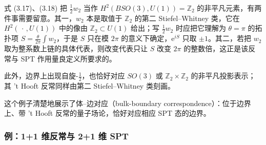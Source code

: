 \begin{yizhu}
式 (3.17)、(3.18) 把 $\frac{1}{2}w_2$ 当作 $H^2(BSO(3),U(1))=\mathbb{Z}_2$ 的非平凡元素，有两件事需要留意。其一，$w_2$ 本是取值于 $\mathbb{Z}_2$ 的第二 Stiefel--Whitney 类，它在 $H^2(\,\cdot\,,U(1))$ 中的像由 $\mathbb{Z}_2\subset U(1)$ 给出；写 $\frac{1}{2}w_2$ 时应把它理解为 $\theta=\pi$ 的拓扑项 $S=\frac{\theta}{2\pi}\int w_2$，于是 $S$ 只在模 $2\pi$ 的意义下确定，$\mathrm{e}^{iS}$ 只取 $\pm 1$。其二，若把 $w_2$ 取为整系数上链的具体代表，则改变代表只让 $S$ 改变 $2\pi$ 的整数倍，这正是该反常与 SPT 作用量良定义所要求的。
\end{yizhu}

此外，边界上出现自旋-$\frac{1}{2}$，也恰好对应 $SO(3)$ 或 $\mathbb{Z}_2 \times \mathbb{Z}_2$ 的非平凡投影表示；其 't Hooft 反常同样由第二 Stiefel--Whitney 类刻画。

这个例子清楚地展示了体--边对应（bulk-boundary correspondence）：位于边界上、带 't Hooft 反常的量子场论，恰好对应相应 SPT 态的边界。

\subsubsection{例：1+1 维反常与 2+1 维 SPT}

